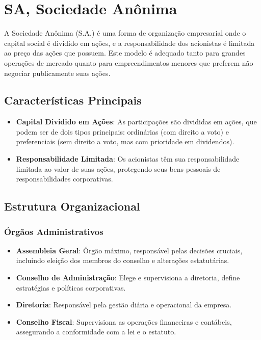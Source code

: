 
\section{SA, Sociedade Anônima}
A Sociedade Anônima (S.A.) é uma forma de organização empresarial onde o capital social é dividido em ações, e a responsabilidade dos acionistas é limitada ao preço das ações que possuem. Este modelo é adequado tanto para grandes operações de mercado quanto para empreendimentos menores que preferem não negociar publicamente suas ações.

\subsection{Características Principais}
\begin{itemize}
    \item \textbf{Capital Dividido em Ações}: As participações são divididas em ações, que podem ser de dois tipos principais: ordinárias (com direito a voto) e preferenciais (sem direito a voto, mas com prioridade em dividendos).
    \item \textbf{Responsabilidade Limitada}: Os acionistas têm sua responsabilidade limitada ao valor de suas ações, protegendo seus bens pessoais de responsabilidades corporativas.
\end{itemize}

\subsection{Estrutura Organizacional}
\subsubsection{Órgãos Administrativos}
\begin{itemize}
    \item \textbf{Assembleia Geral}: Órgão máximo, responsável pelas decisões cruciais, incluindo eleição dos membros do conselho e alterações estatutárias.
    \item \textbf{Conselho de Administração}: Elege e supervisiona a diretoria, define estratégias e políticas corporativas.
    \item \textbf{Diretoria}: Responsável pela gestão diária e operacional da empresa.
    \item \textbf{Conselho Fiscal}: Supervisiona as operações financeiras e contábeis, assegurando a conformidade com a lei e o estatuto.
\end{itemize}

